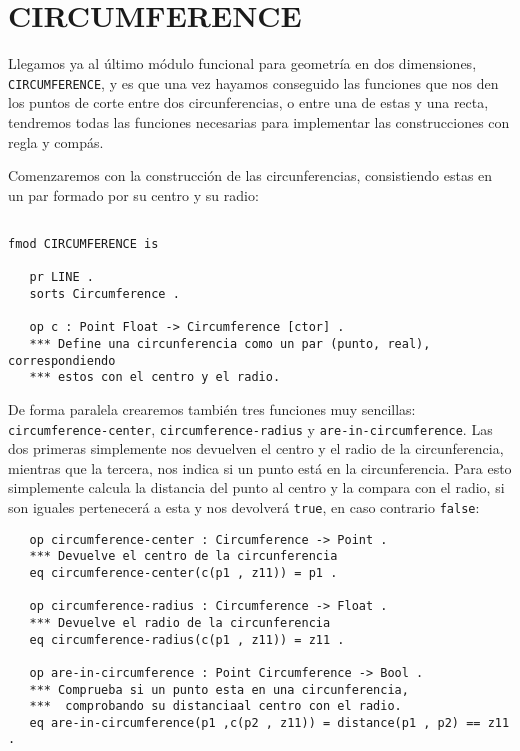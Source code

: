 \section{CIRCUMFERENCE}

Llegamos ya al último módulo funcional para geometría en dos dimensiones, \texttt{CIRCUMFERENCE}, y es que una vez hayamos conseguido las funciones que nos den los puntos de corte entre dos circunferencias, o entre una de estas y una recta, tendremos todas las funciones necesarias para implementar las construcciones con regla y compás.\par
Comenzaremos con la construcción de las circunferencias, consistiendo estas en un par formado por su centro y su radio: \par

{\codesize
\begin{verbatim}

fmod CIRCUMFERENCE is

   pr LINE .
   sorts Circumference .

   op c : Point Float -> Circumference [ctor] .
   *** Define una circunferencia como un par (punto, real), correspondiendo 
   *** estos con el centro y el radio.
\end{verbatim}
}

De forma paralela crearemos también tres funciones muy sencillas: \texttt{circumference-center}, \texttt{circumference-radius} y \texttt{are-in-circumference}. Las dos primeras simplemente nos devuelven el centro y el radio de la circunferencia, mientras que la tercera, nos indica si un punto está en la circunferencia. Para esto simplemente calcula la distancia del punto al centro y la compara con el radio, si son iguales pertenecerá a esta y nos devolverá \texttt{true}, en caso contrario \texttt{false}: \par
{\codesize
\begin{verbatim}		
   op circumference-center : Circumference -> Point .
   *** Devuelve el centro de la circunferencia
   eq circumference-center(c(p1 , z11)) = p1 .

   op circumference-radius : Circumference -> Float .
   *** Devuelve el radio de la circunferencia
   eq circumference-radius(c(p1 , z11)) = z11 .

   op are-in-circumference : Point Circumference -> Bool .
   *** Comprueba si un punto esta en una circunferencia, 
   ***  comprobando su distanciaal centro con el radio.
   eq are-in-circumference(p1 ,c(p2 , z11)) = distance(p1 , p2) == z11 .
\end{verbatim}  
}

